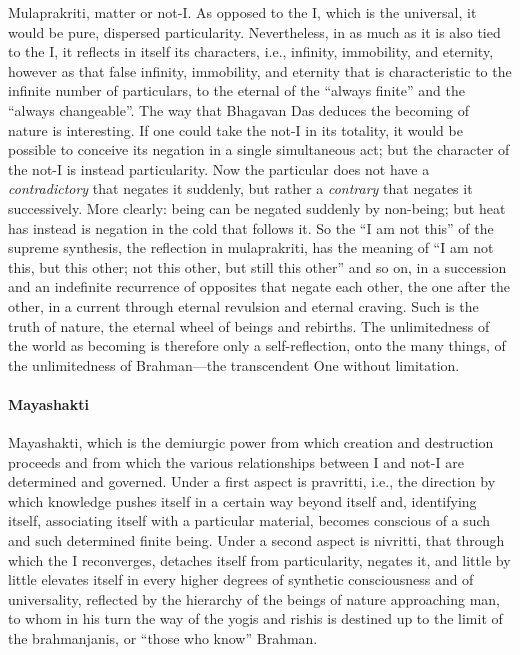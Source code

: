 Mulaprakriti, matter or not-I. As opposed to the I, which is the universal, it would be pure, dispersed particularity. Nevertheless, in as much as it is also tied to the I, it reflects in itself its characters, i.e., infinity, immobility, and eternity, however as that false infinity, immobility, and eternity that is characteristic to the infinite number of particulars, to the eternal of the ``always finite'' and the ``always changeable''. The way that Bhagavan Das deduces the becoming of nature is interesting. If one could take the not-I in its totality, it would be possible to conceive its negation in a single simultaneous act; but the character of the not-I is instead particularity. Now the particular does not have a \emph{contradictory} that negates it suddenly, but rather a \emph{contrary} that negates it successively. More clearly: being can be negated suddenly by non-being; but heat has instead is negation in the cold that follows it. So the ``I am not this'' of the supreme synthesis, the reflection in mulaprakriti, has the meaning of ``I am not this, but this other; not this other, but still this other'' and so on, in a succession and an indefinite recurrence of opposites that negate each other, the one after the other, in a current through eternal revulsion and eternal craving. Such is the truth of nature, the eternal wheel of beings and rebirths. The unlimitedness of the world as becoming is therefore only a self-reflection, onto the many things, of the unlimitedness of Brahman---the transcendent One without limitation.

\paragraph{Mayashakti}


Mayashakti, which is the demiurgic power from which creation and destruction proceeds and from which the various relationships between I and not-I are determined and governed. Under a first aspect is pravritti, i.e., the direction by which knowledge pushes itself in a certain way beyond itself and, identifying itself, associating itself with a particular material, becomes conscious of a such and such determined finite being. Under a second aspect is nivritti, that through which the I reconverges, detaches itself from particularity, negates it, and little by little elevates itself in every higher degrees of synthetic consciousness and of universality, reflected by the hierarchy of the beings of nature approaching man, to whom in his turn the way of the yogis and rishis is destined up to the limit of the brahmanjanis, or ``those who know'' Brahman.

